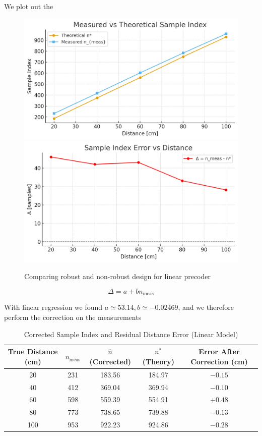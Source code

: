 \documentclass[10pt]{article}
\begin{document}
We plot out the 
\begin{figure}[!h]
	\centering 
	 {
		\includegraphics[width = .45\columnwidth]{fig/distance_vs_sample_theo_meas.png}	
	}
	 {
		\includegraphics[width = .45\columnwidth]{fig/distance_vs_delta.png}
	}
	\caption{Comparing robust and non-robust design for linear precoder}
\label{fig:robust_lin}
\end{figure}


$$
\Delta = a + b n_\mathrm{meas}
$$

With linear regression we found $a \simeq 53.14, b \simeq -0.02469$, and we therefore perform the correction on the measurements


\begin{table}[h!]
\centering
\caption{Corrected Sample Index and Residual Distance Error (Linear Model)}
\begin{tabular}{c|c|c|c|c}
\hline
True Distance (cm) & $n_{\mathrm{meas}}$ & $\hat{n}$ (Corrected) & $n^{*}$ (Theory) & Error After Correction (cm) \\
\hline
20  & 231 & 183.56 & 184.97 & $-0.15$ \\
40  & 412 & 369.04 & 369.94 & $-0.10$ \\
60  & 598 & 559.39 & 554.91 & $+0.48$ \\
80  & 773 & 738.65 & 739.88 & $-0.13$ \\
100 & 953 & 922.23 & 924.86 & $-0.28$ \\
\hline
\end{tabular}
\end{table}

\end{document}
